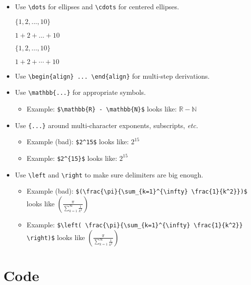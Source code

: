 \documentclass{article}
\begin{document}
\begin{itemize}
\item Use \verb|\dots| for ellipses and \verb|\cdots| for centered ellipses.
  \begin{bad}
$\{1, 2, ..., 10\}$
  \end{bad}
  \begin{bad}
$1 + 2 + ... + 10$
  \end{bad}
  \begin{good}
$\{1, 2, \dots, 10\}$
  \end{good}
  \begin{good}
$1 + 2 + \cdots + 10$
  \end{good}
\item Use \verb|\begin{align} ... \end{align}| for multi-step
  derivations.
\item Use \verb|\mathbb{...}| for appropriate symbols.
  \begin{itemize}
  \item Example: \verb|$\mathbb{R} - \mathbb{N}$| looks like: $\mathbb{R} - \mathbb{N}$
  \end{itemize}
\item Use \verb|{...}| around multi-character exponents, subscripts, \emph{etc.}
  \begin{itemize}
  \item Example (bad): \verb|$2^15$| looks like: $2^15$
  \item Example: \verb|$2^{15}$| looks like: $2^{15}$
  \end{itemize}
\item Use \verb|\left| and \verb|\right| to make sure delimiters are
  big enough.
  \begin{itemize}
  \item Example (bad): %
    \verb|$(\frac{\pi}{\sum_{k=1}^{\infty} \frac{1}{k^2}})$| looks
    like $(\frac{\pi}{\sum_{k=1}^{\infty} \frac{1}{k^2}})$
  \item Example: %
    \verb|$\left( \frac{\pi}{\sum_{k=1}^{\infty} \frac{1}{k^2}} \right)$| looks
    like $\left(\frac{\pi}{\sum_{k=1}^{\infty} \frac{1}{k^2}}\right)$
  \end{itemize}
\end{itemize}

\section*{Code}
\end{document}
